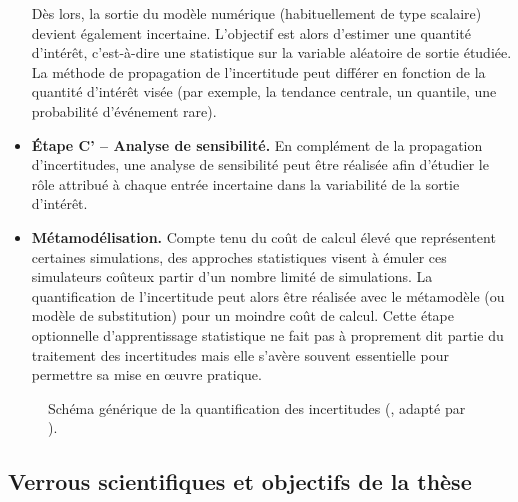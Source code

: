\begin{itemize}
    Dès lors, la sortie du modèle num\'{e}rique (habituellement de type scalaire) devient \'{e}galement incertaine. 
    L'objectif est alors d'estimer une quantit\'{e} d'int\'{e}rêt, c'est-à-dire une statistique sur la variable al\'{e}atoire de sortie \'{e}tudi\'{e}e. 
    La m\'{e}thode de propagation de l'incertitude peut diff\'{e}rer en fonction de la quantit\'{e} d'int\'{e}rêt vis\'{e}e (par exemple, la tendance centrale, un quantile, une probabilit\'{e} d'\'{e}v\'{e}nement rare). 
    \item[\textbullet] \textbf{\'Etape C' -- Analyse de sensibilit\'{e}.} 
    En compl\'{e}ment de la propagation d'incertitudes, une analyse de sensibilit\'{e} peut être r\'{e}alis\'{e}e afin d'\'{e}tudier le rôle attribu\'{e} à chaque entr\'{e}e incertaine dans la variabilit\'{e} de la sortie d'int\'{e}rêt.
    \item[\textbullet] \textbf{M\'{e}tamod\'{e}lisation.} 
    Compte tenu du coût de calcul \'{e}lev\'{e} que repr\'{e}sentent certaines simulations, des approches statistiques visent à \'{e}muler ces simulateurs coûteux partir d'un nombre limit\'{e} de simulations. 
    La quantification de l'incertitude peut alors être r\'{e}alis\'{e}e avec le m\'{e}tamodèle (ou modèle de substitution) pour un moindre coût de calcul. 
    Cette \'{e}tape optionnelle d'apprentissage statistique ne fait pas à proprement dit partie du traitement des incertitudes mais elle s'avère souvent essentielle pour permettre sa mise en \oe uvre pratique. 
\end{itemize}

\begin{figure}[!h]
    \centering
    
    \caption{Sch\'{e}ma g\'{e}n\'{e}rique de la quantification des incertitudes (\citealp{rocquigny_2008}, adapt\'{e} par \citealp{ajenjo_2023}).}
    \label{fig:UQ_methodo_FR}
\end{figure}


\subsection*{Verrous scientifiques et objectifs de la thèse}

